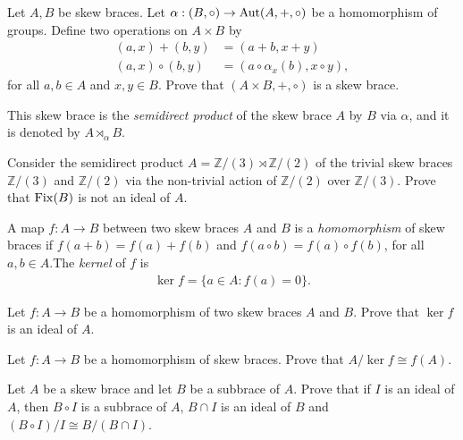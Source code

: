 \begin{exercise}
    Let $A,B$ be skew braces. 
    Let $\alpha: (B,\circ)\to\operatorname{Aut}(A,+,\circ)$ be a homomorphism of groups. 
    Define two operations on $A\times B$ by
    \begin{align*}
        (a,x)+(b,y) &= (a+b,x+y)\\
        (a,x)\circ(b,y) &= (a\circ\alpha_{x}(b), x\circ y),
    \end{align*}
    for all $a,b\in A$ and $x,y\in B$. Prove that $(A\times B, +,\circ)$ is a skew brace. 
    
    This skew brace is the \emph{semidirect product} of the skew brace $A$ by $B$ via $\alpha$, and it is denoted by $A\rtimes_{\alpha}B$.
\end{exercise}

\begin{exercise}\label{ex:fix}
    Consider the semidirect product $A= \mathbb{Z}/(3) \rtimes \mathbb{Z}/(2)$ of the trivial
    skew braces $\mathbb{Z}/(3)$ and $\mathbb{Z}/(2)$ via the non-trivial action of $\mathbb{Z}/(2)$ over $\mathbb{Z}/(3)$.
    Prove that $\operatorname{Fix}(B) $ is not an ideal of $A$.
\end{exercise}

\begin{exercise}
     A map $f:A\to B$ between two skew braces $A$ and $B$ is a \emph{homomorphism} of skew braces if $f(a + b)= f(a) +f(b)$ and $f(a\circ b)= f(a)\circ f(b)$, for all $a,b\in A$.The \emph{kernel} of $f$ is
    \begin{align*}
        \ker f = \{a\in A\colon f(a)=0\}.
    \end{align*}
    
    Let $f:A\to B$ be a homomorphism of two skew braces $A$ and $B$. 
    Prove that $\ker f$ is an ideal of $A$.
\end{exercise}

\begin{exercise}\label{ex:thmiso1}
    Let $f : A\to B$ be a homomorphism of skew braces. Prove that $A/\ker f \cong f(A)$.
\end{exercise}

\begin{exercise}\label{ex:thmiso2}
    Let $A$ be a skew brace and let $B$ be a subbrace of $A$. Prove that if $I$ is an ideal of $A$, then $B\circ I$ is a subbrace of $A$, $B\cap I$ is an ideal of $B$ and $(B\circ I)/I \cong B/(B\cap I)$.
\end{exercise}

